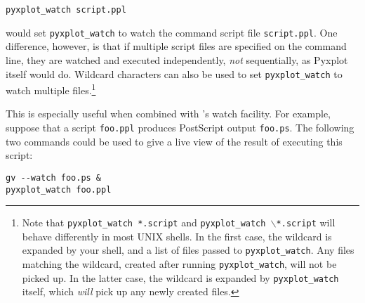 \begin{verbatim}
pyxplot_watch script.ppl
\end{verbatim}

\noindent would set {\tt pyxplot\_watch} to watch the command script file
{\tt script.ppl}. One difference, however, is that if multiple script files are
specified on the command line, they are watched and executed independently,
\textit{not} sequentially, as Pyxplot itself would do. Wildcard characters can
also be used to set {\tt pyxplot\_watch} to watch multiple
files.\footnote{Note that {\tt pyxplot\_watch *.script} and
{\tt pyxplot\_watch $\backslash$*.script} will behave differently in most
UNIX shells.  In the first case, the wildcard is expanded by your shell, and a
list of files passed to {\tt pyxplot\_watch}. Any files matching the
wildcard, created after running {\tt pyxplot\_watch}, will not be picked up.
In the latter case, the wildcard is expanded by {\tt pyxplot\_watch} itself,
which {\it will} pick up any newly created files.}

This is especially useful when combined with \ghostview's
watch facility. For example, suppose that a script {\tt foo.ppl} produces
PostScript output {\tt foo.ps}. The following two commands could be used to
give a live view of the result of executing this script:

\begin{verbatim}
gv --watch foo.ps &
pyxplot_watch foo.ppl
\end{verbatim}

